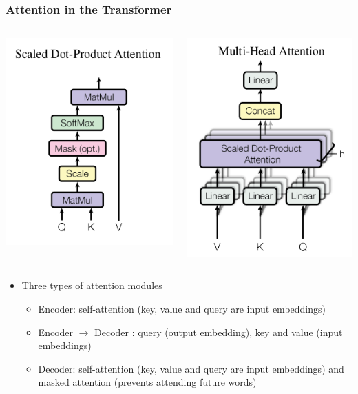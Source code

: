\documentclass[10pt]{beamer}
\begin{document}
\begin{frame}
  \frametitle{Attention in the Transformer}

  \begin{columns}
\begin{center}
	\includegraphics[width=.55\columnwidth]{images/att1}
\end{center}
\begin{center}
	\includegraphics[width=.47\columnwidth]{images/att2}
\end{center}
    \end{columns}
\begin{itemize}
\item Three types of attention modules
\begin{itemize}
\item Encoder: self-attention (key, value and query are input embeddings) 
\item Encoder $\rightarrow$ Decoder : query (output embedding), key and value (input embeddings) 
\item Decoder: self-attention (key, value and query are input embeddings)
and masked attention (prevents attending future words)
\end{itemize}
\end{itemize}

\end{frame}
\end{document}
